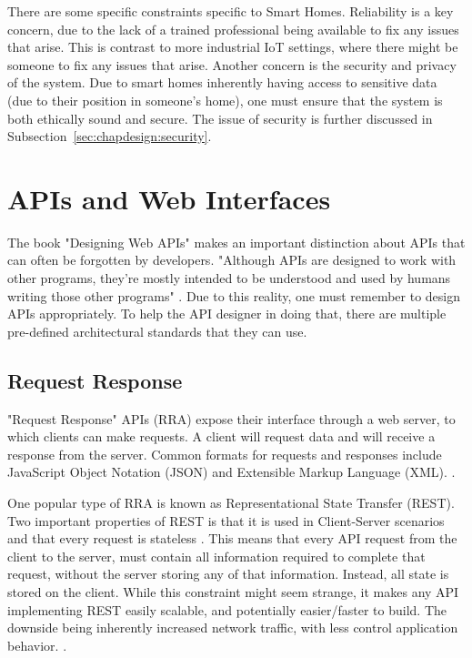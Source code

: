 There are some specific constraints specific to Smart Homes. Reliability is a key concern, due to the lack of a trained professional being available to fix any issues that arise. This is contrast to more industrial IoT settings, where there might be someone to fix any issues that arise. Another concern is the security and privacy of the system. Due to smart homes inherently having access to sensitive data (due to their position in someone's home), one must ensure that the system is both ethically sound and secure. The issue of security is further discussed in Subsection~\ref{sec:chapdesign:security}.


\section{APIs and Web Interfaces} \label{sec:chap2:API}
The book "Designing Web APIs" makes an important distinction about APIs that can often be forgotten by developers. "Although APIs are designed to work with other programs, they’re mostly intended to be understood and used by humans writing those other programs" \cite{DesigningWebApis}. Due to this reality, one must remember to design APIs appropriately. To help the API designer in doing that, there are multiple pre-defined architectural standards that they can use. 

\subsection{Request Response}
"Request Response" APIs (RRA) expose their interface through a web server, to which clients can make requests. A client will request data and will receive a response from the server. Common formats for requests and responses include JavaScript Object Notation (JSON) and Extensible Markup Language (XML). \cite{DesigningWebApis}. 

One popular type of RRA is known as Representational State Transfer (REST). Two important properties of REST is that it is used in Client-Server scenarios and that every request is stateless \cite{ArchitecturalStylesAPIs}. This means that every API request from the client to the server, must contain all information required to complete that request, without the server storing any of that information. Instead, all state is stored on the client. While this constraint might seem strange, it makes any API implementing REST easily scalable, and potentially easier/faster to build. The downside being inherently increased network traffic, with less control application behavior. \cite{ArchitecturalStylesAPIs}.

